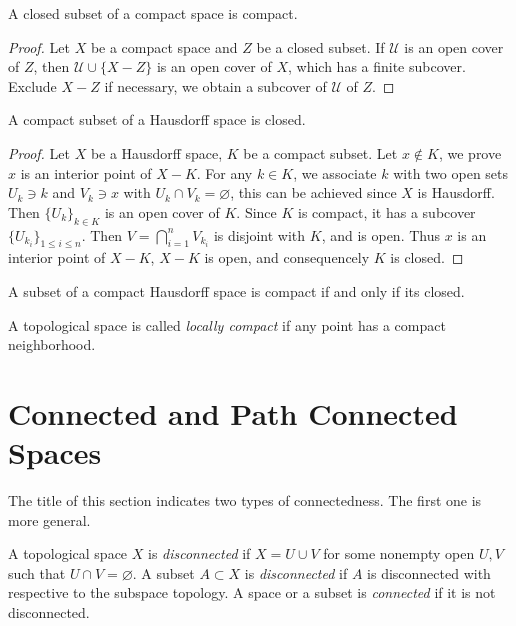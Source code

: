 \begin{prop}
    A closed subset of a compact space is compact.
\end{prop}
\begin{proof}
    Let $X$ be a compact space and $Z$ be a closed subset.
    If $\mathcal{U}$ is an open cover of $Z$, then $\mathcal{U}\cup\{X-Z\}$ is an open cover of $X$, which has a finite subcover.
    Exclude $X-Z$ if necessary, we obtain a subcover of $\mathcal{U}$ of $Z$.
\end{proof}

\begin{prop}
    A compact subset of a Hausdorff space is closed.
\end{prop}
\begin{proof}
    Let $X$ be a Hausdorff space, $K$ be a compact subset.
    Let $x\notin K$, we prove $x$ is an interior point of $X-K$.
    For any $k\in K$, we associate $k$ with two open sets $U_k\ni k$ and $V_k\ni x$ with $U_k\cap V_k=\varnothing$, this can be achieved since $X$ is Hausdorff.
    Then $\{U_k\}_{k\in K}$ is an open cover of $K$.
    Since $K$ is compact, it has a subcover $\{U_{k_i}\}_{1\leq i\leq n}$.
    Then $V=\bigcap_{i=1}^nV_{k_i}$ is disjoint with $K$, and is open.
    Thus $x$ is an interior point of $X-K$, $X-K$ is open, and consequencely $K$ is closed.
\end{proof}

\begin{cor}
    A subset of a compact Hausdorff space is compact if and only if its closed.
\end{cor}

\begin{defn}
    A topological space is called \emph{locally compact} if any point has a compact neighborhood.
\end{defn}

\section{Connected and Path Connected Spaces}

The title of this section indicates two types of connectedness.
The first one is more general.

\begin{defn}
    A topological space $X$ is \emph{disconnected} if $X=U\cup V$ for some nonempty open $U,V$ such that $U\cap V=\varnothing$.
    A subset $A\subset X$ is \emph{disconnected} if $A$ is disconnected with respective to the subspace topology.
    A space or a subset is \emph{connected} if it is not disconnected.
\end{defn}

